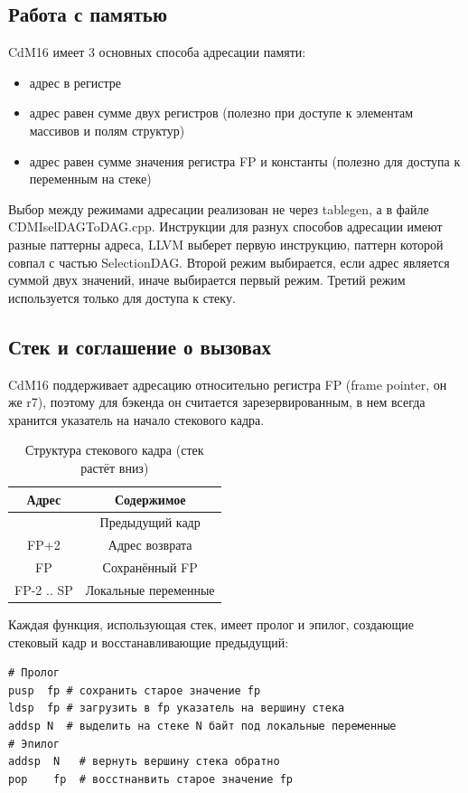 \documentclass[a4paper,14pt]{extarticle}
\begin{document}
\subsection{Работа с памятью}
CdM16 имеет 3 основных способа адресации памяти:
\begin{itemize}
	\item адрес в регистре
	\item адрес равен сумме двух регистров (полезно при доступе к элементам массивов и полям структур)
	\item адрес равен сумме значения регистра FP и константы (полезно для доступа к переменным на стеке)
\end{itemize}

Выбор между режимами адресации реализован не через tablegen, а в файле CDMIselDAGToDAG.cpp. Инструкции для разнух способов адресации имеют разные паттерны адреса, LLVM выберет первую инструкцию, паттерн которой совпал с частью SelectionDAG. Второй режим выбирается, если адрес является суммой двух значений, иначе выбирается первый режим. Третий режим используется только для доступа к стеку.

\subsection{Стек и соглашение о вызовах}
CdM16 поддерживает адресацию относительно регистра FP (frame pointer, он же r7), поэтому для бэкенда он считается зарезервированным, в нем всегда хранится указатель на начало стекового кадра.
\begin{table}[!h]
	\begin{center}
		\begin{tabular}{ |c|c| }
			\hline
			Адрес & Содержимое \\
			\hline
			 & Предыдущий кадр \\
			 FP+2 & Адрес возврата \\
			 FP & Сохранённый FP \\
			 FP-2 .. SP & Локальные переменные \\
			 \hline
		\end{tabular}
		\caption{Структура стекового кадра (стек растёт вниз)}
	\end{center}
\end{table}

Каждая функция, использующая стек, имеет пролог и эпилог, создающие стековый кадр и восстанавливающие предыдущий:
\begin{verbatim}
# Пролог
pusр  fp # сохранить старое значение fp
ldsp  fp # загрузить в fp указатель на вершину стека
addsp N  # выделить на стеке N байт под локальные переменные
# Эпилог
addsp  N   # вернуть вершину стека обратно
pop    fp  # восстнанвить старое значение fp
\end{verbatim}
\end{document}
